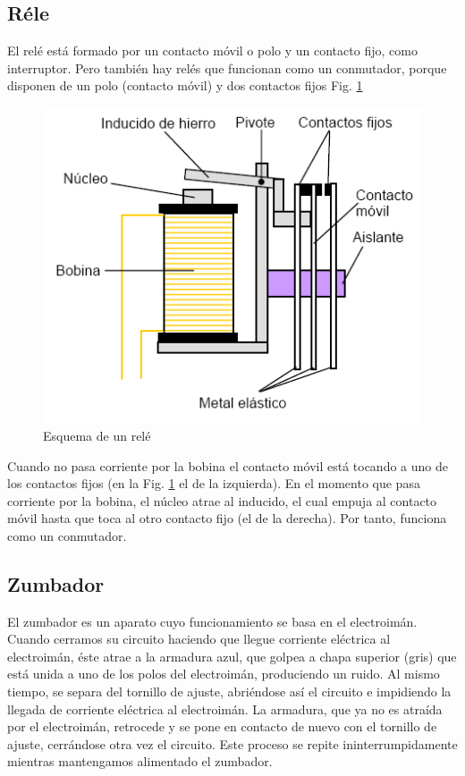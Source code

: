 \documentclass[twocolumn]{IEEEtran}
\begin{document}
\subsection{Réle}
\noindent
El relé está formado por un contacto móvil o polo y un contacto fijo, como interruptor. Pero también hay relés que funcionan como un conmutador, porque disponen de un polo (contacto móvil) y dos contactos fijos Fig. \ref{fig1}
\begin{figure}[H]
	\centering
		\includegraphics[scale=0.5]{rele.png}
	\caption{Esquema de un relé}
	\label{fig1}
\end{figure} 
\noindent
Cuando no pasa corriente por la bobina el contacto móvil está tocando a uno de los contactos fijos (en la Fig. \ref{fig1} el de la izquierda). En el momento que pasa corriente por la bobina, el núcleo atrae al inducido, el cual empuja al contacto móvil hasta que toca al otro contacto fijo (el de la derecha). Por tanto, funciona como un conmutador.

\subsection{Zumbador}
\noindent
El zumbador es un aparato cuyo funcionamiento se basa en el electroimán. Cuando cerramos su circuito haciendo que llegue corriente eléctrica al electroimán, éste atrae a la armadura azul, que golpea a chapa superior (gris) que está unida a uno de los polos del electroimán, produciendo un ruido. Al mismo tiempo, se separa del tornillo de ajuste, abriéndose así el circuito e impidiendo la llegada de corriente eléctrica al electroimán. La armadura, que ya no es atraída por el electroimán, retrocede y se pone en contacto de nuevo con el tornillo de ajuste, cerrándose otra vez el circuito. Este proceso se repite ininterrumpidamente mientras mantengamos alimentado el zumbador.
\end{document}
